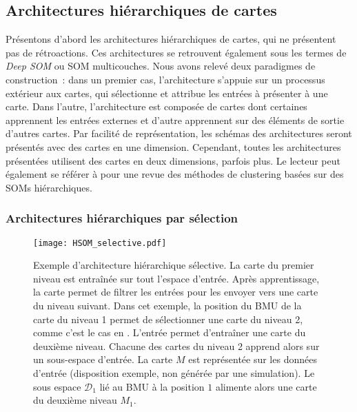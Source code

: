 \documentclass[../main]{subfiles}
\begin{document}
\subsection{Architectures hiérarchiques de cartes}

Présentons d'abord les architectures hiérarchiques de cartes, qui ne présentent pas de rétroactions. Ces architectures se retrouvent également sous les termes de \emph{Deep SOM} ou SOM multicouches.
Nous avons relevé deux paradigmes de construction~: dans un premier cas, l'architecture s'appuie sur un processus extérieur aux cartes, qui sélectionne et attribue les entrées à présenter à une carte.
Dans l'autre, l'architecture est composée de cartes dont certaines apprennent les entrées externes et d'autre apprennent sur des éléments de sortie d'autres cartes.
Par facilité de représentation, les schémas des architectures seront présentés avec des cartes en une dimension. Cependant, toutes les architectures présentées utilisent des cartes en deux dimensions, parfois plus.
Le lecteur peut également se référer à \cite{henriques_spatial_2012} pour une revue des méthodes de clustering basées sur des SOMs hiérarchiques. 

\subsubsection{Architectures hiérarchiques par sélection}

\begin{figure}
    \texttt{[image: HSOM\_selective.pdf]}
    \caption{Exemple d'architecture hiérarchique sélective. La carte du premier niveau est entraînée sur tout l'espace d'entrée. Après apprentissage, la carte permet de filtrer les entrées pour les envoyer vers une carte du niveau suivant. Dans cet exemple, la position du BMU de la carte du niveau 1 permet de sélectionner une carte du niveau 2, comme c'est le cas en \cite{barbalho_hierarchical_2001}. 
    L'entrée permet d'entraîner une carte du deuxième niveau. Chacune des cartes du niveau 2 apprend alors sur un sous-espace d'entrée. La carte $M$ est représentée sur les données d'entrée (disposition exemple, non générée par une simulation). Le sous espace $\mathcal{D}_1$ lié au BMU à la position $1$ alimente alors une carte du deuxième niveau $M_1$.
    \label{fig:hsom_selective}}
\end{figure}
\end{document}
